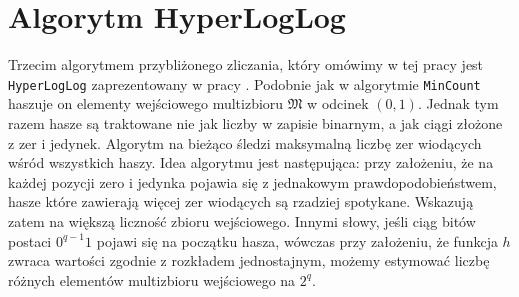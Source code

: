 
\section{Algorytm HyperLogLog}

Trzecim algorytmem przybliżonego zliczania, który omówimy w tej pracy jest \texttt{HyperLogLog} zaprezentowany w pracy \cite{hll}. Podobnie jak w algorytmie \texttt{MinCount}  haszuje on elementy wejściowego  multizbioru $\mathfrak{M}$ w odcinek $(0,1)$. Jednak tym razem hasze są traktowane nie jak liczby w zapisie binarnym, a jak ciągi złożone z zer i jedynek. Algorytm na bieżąco śledzi maksymalną liczbę zer wiodących wśród wszystkich haszy. Idea algorytmu jest następująca: przy założeniu, że na każdej pozycji zero i jedynka pojawia się z jednakowym prawdopodobieństwem,  hasze które zawierają więcej zer wiodących są rzadziej spotykane. Wskazują zatem na większą liczność zbioru wejściowego. Innymi słowy, jeśli ciąg bitów postaci $0^{q-1}1$ pojawi się na początku hasza, wówczas przy założeniu, że funkcja $h$ zwraca wartości zgodnie z rozkładem jednostajnym, możemy estymować liczbę różnych elementów multizbioru wejściowego na $2^{q}$.

